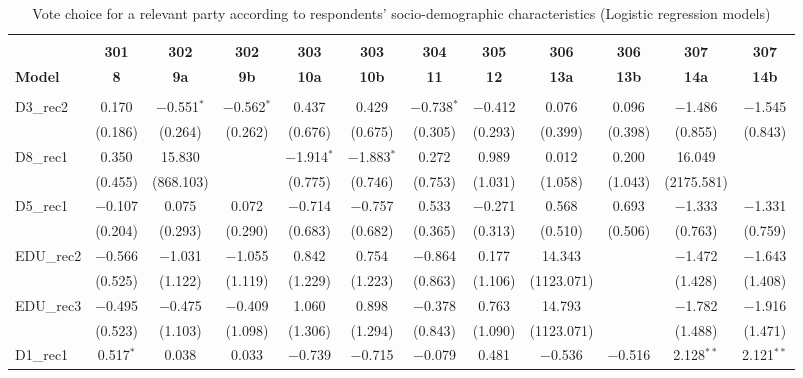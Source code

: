 \documentclass[
]{article}
\begin{document}
\begin{table}[!htbp] \centering 
  \caption{Vote choice for a relevant party according to respondents' 
                       socio-demographic characteristics (Logistic regression models)} 
  \label{table:full_logit_bg} 
\begin{tabular}{@{\extracolsep{0.5pt}}lccccccccccc} 
\\[-1.8ex]\hline \\[-1.8ex] 
 & \textbf{301} & \textbf{302} & \textbf{302} & \textbf{303} & \textbf{303} & \textbf{304} & \textbf{305} & \textbf{306} & \textbf{306} & \textbf{307} & \textbf{307} \\ 
\textbf{Model} & \textbf{8} & \textbf{9a} & \textbf{9b} & \textbf{10a} & \textbf{10b} & \textbf{11} & \textbf{12} & \textbf{13a} & \textbf{13b} & \textbf{14a} & \textbf{14b}\\ 
\hline \\[-1.8ex] 
 D3\_rec2 & 0.170 & $-$0.551$^{*}$ & $-$0.562$^{*}$ & 0.437 & 0.429 & $-$0.738$^{*}$ & $-$0.412 & 0.076 & 0.096 & $-$1.486 & $-$1.545 \\ 
  & (0.186) & (0.264) & (0.262) & (0.676) & (0.675) & (0.305) & (0.293) & (0.399) & (0.398) & (0.855) & (0.843) \\ 
  D8\_rec1 & 0.350 & 15.830 &  & $-$1.914$^{*}$ & $-$1.883$^{*}$ & 0.272 & 0.989 & 0.012 & 0.200 & 16.049 &  \\ 
  & (0.455) & (868.103) &  & (0.775) & (0.746) & (0.753) & (1.031) & (1.058) & (1.043) & (2175.581) &  \\ 
  D5\_rec1 & $-$0.107 & 0.075 & 0.072 & $-$0.714 & $-$0.757 & 0.533 & $-$0.271 & 0.568 & 0.693 & $-$1.333 & $-$1.331 \\ 
  & (0.204) & (0.293) & (0.290) & (0.683) & (0.682) & (0.365) & (0.313) & (0.510) & (0.506) & (0.763) & (0.759) \\ 
  EDU\_rec2 & $-$0.566 & $-$1.031 & $-$1.055 & 0.842 & 0.754 & $-$0.864 & 0.177 & 14.343 &  & $-$1.472 & $-$1.643 \\ 
  & (0.525) & (1.122) & (1.119) & (1.229) & (1.223) & (0.863) & (1.106) & (1123.071) &  & (1.428) & (1.408) \\ 
  EDU\_rec3 & $-$0.495 & $-$0.475 & $-$0.409 & 1.060 & 0.898 & $-$0.378 & 0.763 & 14.793 &  & $-$1.782 & $-$1.916 \\ 
  & (0.523) & (1.103) & (1.098) & (1.306) & (1.294) & (0.843) & (1.090) & (1123.071) &  & (1.488) & (1.471) \\ 
  D1\_rec1 & 0.517$^{*}$ & 0.038 & 0.033 & $-$0.739 & $-$0.715 & $-$0.079 & 0.481 & $-$0.536 & $-$0.516 & 2.128$^{**}$ & 2.121$^{**}$ \\ 

\end{tabular}
\end{table}
\end{document}

